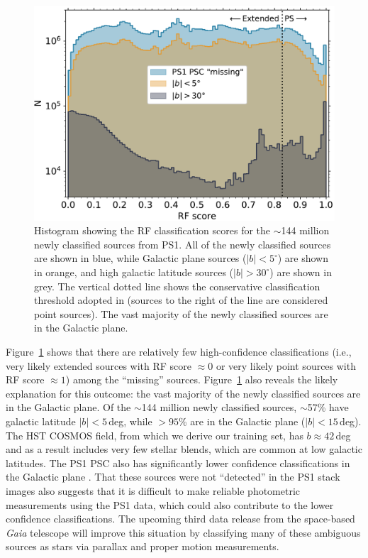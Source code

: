 \documentclass[twocolumn]{aastex63}
\begin{document}
\begin{figure}
    \centering
    \includegraphics[width=\columnwidth]{./figures/PS1_PSC_update_hist.pdf}
    \caption{Histogram showing the RF classification scores for the $\sim$144
    million newly classified sources from PS1. All of the newly classified
    sources are shown in blue, while Galactic plane sources ($|b| <
    5^{\circ}$) are shown in orange, and high galactic latitude sources ($|b|
    > 30^{\circ}$) are shown in grey. The vertical dotted line shows the
    conservative classification threshold adopted in \citet{Tachibana18}
    (sources to the right of the line are considered point sources). The vast
    majority of the newly classified sources are in the Galactic plane.}
    \label{fig:psc_update}
\end{figure}    

Figure~\ref{fig:psc_update} shows that there are relatively few
high-confidence classifications (i.e., very likely extended sources with RF
score $\approx 0$ or very likely point sources with RF score $\approx 1$)
among the ``missing'' sources. Figure~\ref{fig:psc_update} also reveals the
likely explanation for this outcome: the vast majority of the newly classified
sources are in the Galactic plane. Of the $\sim$144 million newly classified
sources, $\sim$57\% have galactic latitude $\lvert b \rvert < 5$\,deg, while
$> 95$\% are in the Galactic plane ($\lvert b \rvert < 15$\,deg). The HST
COSMOS field, from which we derive our training set, has $b \approx 42$\,deg
and as a result includes very few stellar blends, which are common at low
galactic latitudes. The PS1 PSC also has significantly lower confidence
classifications in the Galactic plane \citep[see Figure~8 in][]{Tachibana18}.
That these sources were not ``detected'' in the PS1 stack images also suggests
that it is difficult to make reliable photometric measurements using the PS1
data, which could also contribute to the lower confidence classifications. The
upcoming third data release from the space-based \textit{Gaia} telescope
\citep{Perryman01} will improve this situation by classifying many of these
ambiguous sources as stars via parallax and proper motion measurements.
\end{document}
